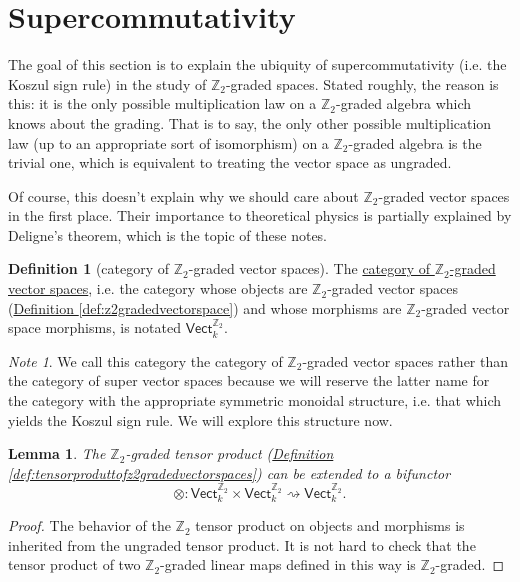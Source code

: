 \documentclass[a4paper,10pt]{scrreprt}
\newcommand{\Z}{\mathbb{Z}}
\newcommand{\defn}[1]{\ul{#1}}
\theoremstyle{definition}
\newtheorem{definition}{Definition}[section]
\theoremstyle{plain}
\newtheorem{lemma}{Lemma}[section]
\theoremstyle{remark}
\newtheorem{note}{Note}[section]
\begin{document}
\section{Supercommutativity}
The goal of this section is to explain the ubiquity of supercommutativity (i.e. the Koszul sign rule) in the study of $\Z_{2}$-graded spaces. Stated roughly, the reason is this: it is the only possible multiplication law on a $\Z_{2}$-graded algebra which knows about the grading. That is to say, the only other possible multiplication law (up to an appropriate sort of isomorphism) on a $\Z_{2}$-graded algebra is the trivial one, which is equivalent to treating the vector space as ungraded. 

Of course, this doesn't explain why we should care about $\Z_{2}$-graded vector spaces in the first place. Their importance to theoretical physics is partially explained by Deligne's theorem, which is the topic of these notes.

\begin{definition}[category of $\Z_{2}$-graded vector spaces]
  \label{def:categoryofz2gradedvectorspaces}
  The \defn{category of $\Z_{2}$-graded vector spaces}, i.e. the category whose objects are $\Z_{2}$-graded vector spaces (\hyperref[def:z2gradedvectorspace]{Definition \ref*{def:z2gradedvectorspace}}) and whose morphisms are $\Z_{2}$-graded vector space morphisms, is notated $\mathsf{Vect}_{k}^{\Z_{2}}$.
\end{definition}

\begin{note}
  We call this category the category of $\Z_{2}$-graded vector spaces rather than the category of super vector spaces because we will reserve the latter name for the category with the appropriate symmetric monoidal structure, i.e. that which yields the Koszul sign rule. We will explore this structure now.
\end{note}

\begin{lemma}
  The $\Z_{2}$-graded tensor product (\hyperref[def:tensorproduttofz2gradedvectorspaces]{Definition \ref*{def:tensorproduttofz2gradedvectorspaces}}) can be extended to a bifunctor 
  \begin{equation*}
    \otimes\colon \mathsf{Vect}_k^{\Z_{2}} \times \mathsf{Vect}_k^{\Z_{2}} \rightsquigarrow \mathsf{Vect}_k^{\Z_{2}}.
  \end{equation*}
\end{lemma}
\begin{proof}
  The behavior of the $\Z_{2}$ tensor product on objects and morphisms is inherited from the ungraded tensor product. It is not hard to check that the tensor product of two $\Z_{2}$-graded linear maps defined in this way is $\Z_{2}$-graded.
\end{proof}
\end{document}
